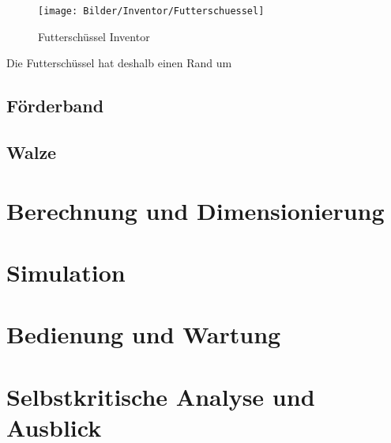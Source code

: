 \begin{figure}
\vspace{-40pt}
  \begin{center}
    \texttt{[image: Bilder/Inventor/Futterschuessel]}
  \end{center}
  \caption{Futterschüssel Inventor}
  \label{Futterschuessel_Inventor}
  \vspace{-10pt}
\end{figure}
Die Futterschüssel hat deshalb einen Rand um 




\subsection{Förderband}
\subsection{Walze}
\section{Berechnung und Dimensionierung}
\section{Simulation}
\section{Bedienung und Wartung}
\section{Selbstkritische Analyse und Ausblick}

